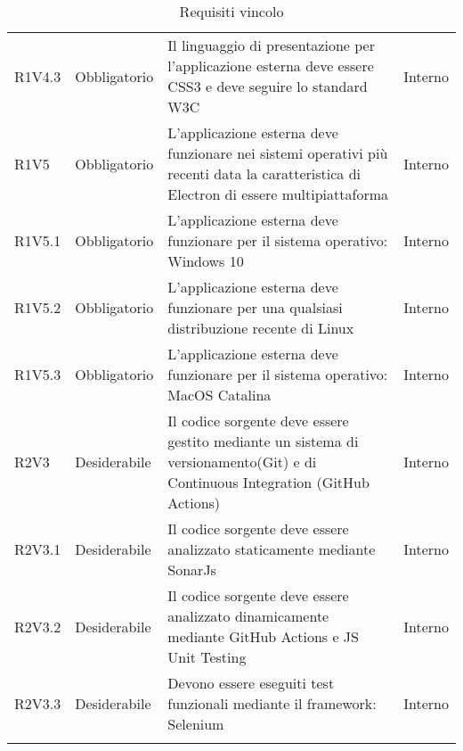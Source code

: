 \begin{longtable} {
		>{\centering}p{18mm} 
		>{\centering}p{28mm}
		>{}p{50mm} 
		>{}p{28mm}
		}
	R1V4.3 & 
	Obbligatorio & 
	Il linguaggio di presentazione per l'applicazione esterna deve essere CSS3 e deve seguire lo standard W3C &
	Interno  \TBstrut \\ [2mm]
	
	R1V5 & 
	Obbligatorio & 
	L'applicazione esterna deve funzionare nei sistemi operativi più recenti data la caratteristica di Electron di essere multipiattaforma & 
	Interno  \TBstrut \\ [2mm]

	R1V5.1 & 
	Obbligatorio & 
	L'applicazione esterna deve funzionare per il sistema operativo: Windows 10 &
	Interno  \TBstrut \\ [2mm]

	R1V5.2 & 
	Obbligatorio & 
	L'applicazione esterna deve funzionare per una qualsiasi distribuzione recente di Linux &
	Interno  \TBstrut \\ [2mm]

	R1V5.3 & 
	Obbligatorio & 
	L'applicazione esterna deve funzionare per il sistema operativo: MacOS Catalina &
	Interno  \TBstrut \\ [2mm]


		
	R2V3 &
	Desiderabile &
	Il codice sorgente deve essere gestito mediante un sistema di versionamento\glosp (Git) e di Continuous Integration (GitHub Actions) &
	Interno  \TBstrut \\ [2mm]		
	
	R2V3.1 &
	Desiderabile &
	Il codice sorgente deve essere analizzato staticamente mediante SonarJs\glo &
	Interno  \TBstrut \\ [2mm]
	
	R2V3.2 &
	Desiderabile &
	Il codice sorgente deve essere analizzato dinamicamente mediante GitHub Actions e JS Unit Testing &
	Interno  \TBstrut \\ [2mm]
	
	R2V3.3 &
	Desiderabile &
	Devono essere eseguiti test funzionali mediante il framework: Selenium &
	Interno  \TBstrut \\ [2mm]
	
	\rowcolor{white}
	\caption{Requisiti vincolo}
\end{longtable}
